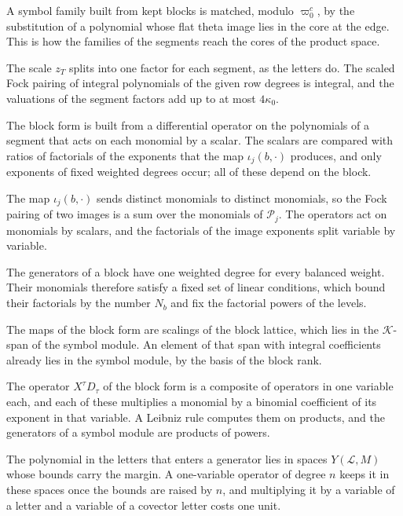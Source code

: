 A symbol family built from kept blocks is matched, modulo $\varpi_0^c$, by the substitution of a polynomial whose flat theta
image lies in the core at the edge. This is how the families of the segments reach the cores of the product space.

The scale $z_T$ splits into one factor for each segment, as the letters do. The scaled Fock pairing of integral polynomials
of the given row degrees is integral, and the valuations of the segment factors add up to at most $4\kappa_0$.

The block form is built from a differential operator on the polynomials of a segment that acts on each monomial by a
scalar. The scalars are compared with ratios of factorials of the exponents that the map $\iota_j(b,\cdot)$ produces, and
only exponents of fixed weighted degrees occur; all of these depend on the block.

The map $\iota_j(b,\cdot)$ sends distinct monomials to distinct monomials, so the Fock pairing of two images is a sum over
the monomials of $\mathcal P_j$. The operators act on monomials by scalars, and the factorials of the image exponents split
variable by variable.

The generators of a block have one weighted degree for every balanced weight. Their monomials therefore satisfy a fixed
set of linear conditions, which bound their factorials by the number $N_b$ and fix the factorial powers of the levels.

The maps of the block form are scalings of the block lattice, which lies in the $\mathcal K$-span of the symbol module.
An element of that span with integral coefficients already lies in the symbol module, by the basis of the block rank.

The operator $X^\tau D_\tau$ of the block form is a composite of operators in one variable each, and each of these
multiplies a monomial by a binomial coefficient of its exponent in that variable. A Leibniz rule computes them on products,
and the generators of a symbol module are products of powers.

The polynomial in the letters that enters a generator lies in spaces $Y(\mathcal L,M)$ whose bounds carry the margin. A
one-variable operator of degree $n$ keeps it in these spaces once the bounds are raised by $n$, and multiplying it by a
variable of a letter and a variable of a covector letter costs one unit.

